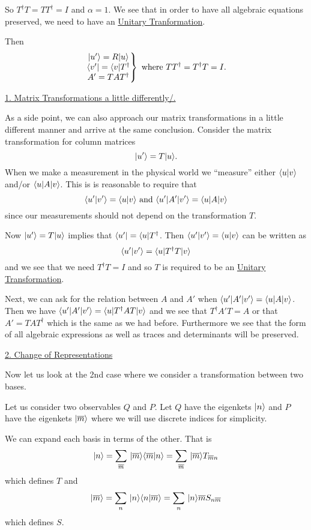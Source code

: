  So $T^\dagger T = TT ^\dagger = I$ and $\alpha = 1$. We see that in order to have all algebraic equations preserved, we need to have an \underline{Unitary Tranformation}.

Then 
$$
\left.\begin{matrix}
|u'\rangle= R|u\rangle\\
\langle v'| = \langle v|T^\dagger\\
A' = TAT^\dagger
\end{matrix}\right\}
\mbox{ where }
T T^\dagger = T^\dagger T = I.$$

\underline{1. Matrix Transformations a little differently/.}

As a side point, we can also approach our matrix transformations in a little different manner and arrive at the same conclusion. Consider the matrix transformation for column matrices
$$|u'\rangle = T|u\rangle.$$
When we make a measurement in the physical world we ``measure'' either $\langle u|v\rangle$ and/or $\langle u| A| v \rangle$. This is is reasonable to require that $$\langle u'|v'\rangle = \langle u|v\rangle \mbox{ and } \langle u'| A'| v' \rangle = \langle u| A| v \rangle$$
since our measurements should not depend on the transformation $T$. 

Now $|u'\rangle= T|u\rangle$ implies that $\langle u'| = \langle u|T^\dagger$. Then $\langle u'|v'\rangle = \langle u|v\rangle$ can be written as 
$$\langle u'|v'\rangle = \langle u| T^\dagger T| v \rangle$$ and we see that we
need $T^\dagger T = I$ and so $T$ is required to be an \underline{Unitary Transformation}.

Next, we can ask for the relation between $A$ and $A'$ when $\langle u'| A'| v' \rangle = \langle u| A| v \rangle$. Then we have 
$\langle u'| A'| v' \rangle = \langle u| T^\dagger A T| v \rangle$ and we see  that $T^\dagger A' T  = A$ or that $A' = TAT^\dagger$ which is the same as we had before. Furthermore we see that the form of all algebraic expressions as well as
traces and determinants will be preserved. 

\underline{2. Change of Representations}

Now let us look at the 2nd case where we consider a transformation between two bases. 

Let us consider two observables $Q$ and $P$. Let $Q$ have the eigenkets $|n\rangle$ and $P$ have the eigenkets $|\overline{m}\rangle$ where we will use discrete indices for simplicity. 

We can expand each basis in terms of the other. That is 
$$|n\rangle = \sum_{\overline{m}}\, |\overline{m}\rangle\langle \overline{m}|n\rangle = \sum_{\overline{m}}\, |\overline{m}\rangle T_{\overline{m}n}$$ which defines $T$ and 
$$|\overline{m}\rangle = \sum_{n} \, |n\rangle\langle n|\overline{m}\rangle = \sum_{n}\, |n\rangle{\overline{m}} S_{n\overline{m}}$$ which defines $S$.

